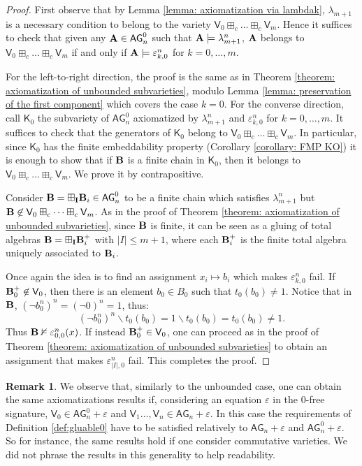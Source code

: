 \documentclass{amsart}
\theoremstyle{definition}
\newtheorem{remark}[theorem]{Remark}
\numberwithin{equation}{section}
\newcommand{\alg}[1]{{\textbf{\upshape #1}}}  %
\newcommand{\vv}[1]{\mathsf {#1}}
\newcommand{\BG}{\vv{AG}}
\begin{document}
\begin{proof}
	First observe that by Lemma \ref{lemma: axiomatization via lambdak}, $\lambda_{m+1}$ is a necessary condition to belong to the variety $\vv V_0 \boxplus_c \dots \boxplus_c \vv V_m$. Hence it suffices to check that given any $\alg A \in \BG_n^0$ such that $\alg A \models \lambda_{m+1}^n$, $\alg A$ belongs to $\vv V_0 \boxplus_c \dots \boxplus_c \vv V_m$ if and only if $\alg A \models \varepsilon_{k,0}^n$ for $k=0, \dots, m$. 
	
	For the left-to-right direction, the proof is the same as in Theorem \ref{theorem: axiomatization of unbounded subvarieties}, modulo Lemma \ref{lemma: preservation of the first component} which covers the case $k = 0$. 
	For the converse direction, call $\vv K_0$  the subvariety of $\BG_n^0$ axiomatized by $\lambda_{m+1}^n$ and $\varepsilon_{k,0}^n$ for $k=0, \dots, m$. It suffices to check that the generators of $\vv K_0$ belong to  $\vv V_0 \boxplus_c \dots \boxplus_c \vv V_m$. In particular, since $\vv K_0$ has the finite embeddability property (Corollary \ref{corollary: FMP KO}) it is enough to show that if $\alg B$ is a finite chain in $\vv K_0$, then it belongs to $\vv V_0 \boxplus_c \dots \boxplus_c \vv V_m$. We prove it by contrapositive.
	
	Consider $\alg B = \boxplus_{\bf I} \alg B_i \in \BG_n^0$ to be a finite chain which satisfies $\lambda_{m+1}^n$ but $\alg B \not \in \vv V_0 \boxplus_c \dots \boxplus_c \vv V_m$. As in the proof of Theorem \ref{theorem: axiomatization of unbounded subvarieties}, since $\alg B$ is finite, it can be seen as a gluing of total algebras $\alg B = \boxplus_{\bf I}\alg B_i ^+ $ with $|I| \leq m + 1$, where each $\alg B_i^+$ is the finite total algebra uniquely associated to $\alg B_i$. 
	
	Once again the idea is to find an assignment $x_i \mapsto b_i$ which makes $\varepsilon_{k,0}^n$ fail. If $\alg B_0^+ \not \in \vv V_0$, then there is an element $b_0 \in B_0$ such that $t_0(b_0) \neq 1$. Notice that in $\alg B$, $(\neg b_0^n)^n = (\neg 0)^n = 1$, thus: $$(\neg b_0^n)^n \backslash t_0(b_0) = 1 \backslash t_0(b_0) = t_0(b_0) \neq 1.$$
	Thus $\alg B \nvDash \varepsilon_{0,0}^n(x)$.
If instead $\alg B_0^+ \in \vv V_0$, one can proceed as in the proof of Theorem \ref{theorem: axiomatization of unbounded subvarieties} to obtain an assignment that makes $\varepsilon_{|I|,0}^n$ fail. This completes the proof.
\end{proof}
\begin{remark}
	We observe that, similarly to the unbounded case, one can obtain the same axiomatizations results if, considering an equation $\varepsilon$ in the $0$-free signature, $\vv V_0 \in \BG_n^0 + \varepsilon$ and $\vv V_1 \ldots, \vv V_n \in \BG_n + \varepsilon$. In this case the requirements of Definition \ref{def:gluable0} have to be satisfied relatively to $\BG_n + \varepsilon$ and $\BG_n^0 + \varepsilon$. So for instance, the same results hold if one consider commutative varieties. We did not phrase the results in this generality to help readability.
\end{remark}
\end{document}
